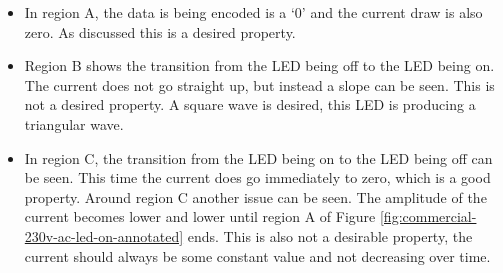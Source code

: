 \begin{itemize}

	\item In region A, the data is being encoded is a `0' and the current draw is also zero.
	As discussed this is a desired property.

	\item Region B shows the transition from the LED being off to the LED being on.
	The current does not go straight up, but instead a slope can be seen.
	This is not a desired property.
	A square wave is desired, this LED is producing a triangular wave.

	\item In region C, the transition from the LED being on to the LED being off can be seen.
	This time the current does go immediately to zero, which is a good property.
	Around region C another issue can be seen. 
	The amplitude of the current becomes lower and lower until region A of Figure \ref{fig:commercial-230v-ac-led-on-annotated} ends.
	This is also not a desirable property, the current should always be some constant value and not decreasing over time.

\end{itemize} 













